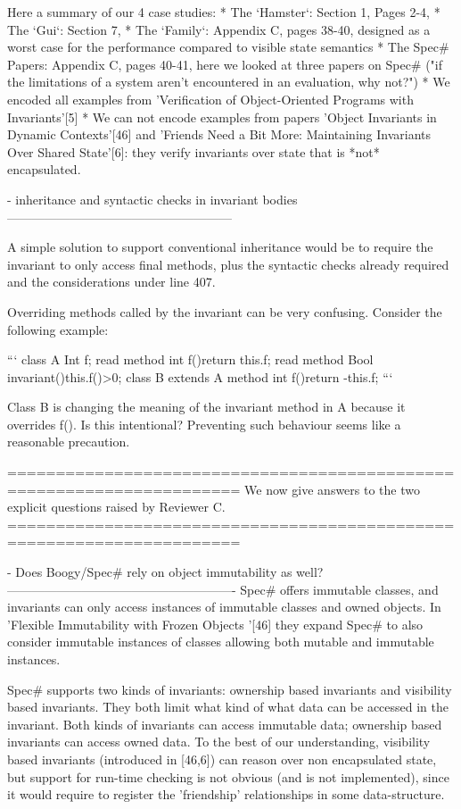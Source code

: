 Here a summary of our 4 case studies:
* The `Hamster`: Section 1, Pages 2-4, 
* The `Gui`: Section 7,
* The `Family`: Appendix C, pages 38-40,
  designed as a worst case for the performance compared to visible state semantics
* The Spec# Papers: Appendix C, pages 40-41,
  here we looked at three papers on Spec# ("if the limitations of a system aren't encountered in an evaluation, why not?")
 *  We encoded all examples from 'Verification of Object-Oriented Programs with Invariants'[5]
 *  We can not encode examples from papers 'Object Invariants in Dynamic Contexts'[46] and
   'Friends Need a Bit More: Maintaining Invariants Over Shared State'[6]:
   they verify invariants over state that is *not* encapsulated.


- inheritance and syntactic checks in invariant bodies
------------------------------------------------------

A simple solution to support conventional inheritance would be to require the invariant to only
access final methods, plus the syntactic checks already required and the considerations under line 407.

Overriding methods called by the invariant can be very confusing.
Consider the following example:

```
class A{
  Int f;
  read method int f(){return this.f;}
  read method Bool invariant(){this.f()>0;}
}
class B extends A {
  method int f(){return -this.f;}
}
```

Class B is changing the meaning of the invariant method in A because it overrides f().
Is this intentional? Preventing such behaviour seems like a reasonable precaution.


======================================================================
We now give answers to the two explicit questions raised by Reviewer C.
======================================================================


- Does Boogy/Spec# rely on object immutability as well?
-------------------------------------------------------
Spec# offers immutable classes, and invariants can only access instances of
immutable classes and owned objects. In 'Flexible Immutability with Frozen Objects
'[46] they expand Spec# to also
consider immutable instances of classes allowing both mutable and immutable instances.

Spec# supports two kinds of invariants: ownership based invariants and visibility based invariants.
They both limit what kind of what data can be accessed in the invariant.
Both kinds of invariants can access immutable data;
ownership based invariants can access owned data.
To the best of our understanding, visibility based invariants (introduced in [46,6])
can reason over non encapsulated state, 
but support for run-time checking is not obvious (and is not implemented), since it would
require to register the 'friendship' relationships in some data-structure.


